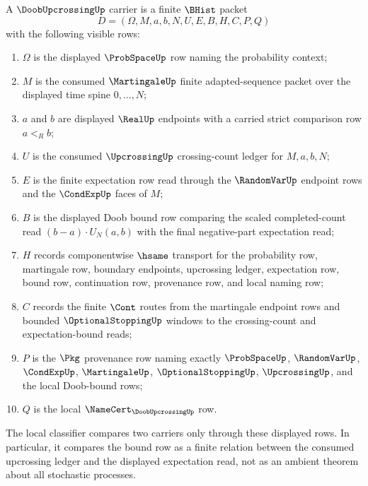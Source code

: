 \begin{definition}
\label{def:doob-upcrossing-carrier}
A $\DoobUpcrossingUp$ carrier is a finite $\BHist$ packet
$$
D=(\Omega,M,a,b,N,U,E,B,H,C,P,Q)
$$
with the following visible rows:
\begin{enumerate}
\item $\Omega$ is the displayed $\ProbSpaceUp$ row naming the probability context;
\item $M$ is the consumed $\MartingaleUp$ finite adapted-sequence packet over the displayed time spine $0,\ldots,N$;
\item $a$ and $b$ are displayed $\RealUp$ endpoints with a carried strict comparison row $a<_R b$;
\item $U$ is the consumed $\UpcrossingUp$ crossing-count ledger for $M,a,b,N$;
\item $E$ is the finite expectation row read through the $\RandomVarUp$ endpoint rows and the $\CondExpUp$ faces of $M$;
\item $B$ is the displayed Doob bound row comparing the scaled completed-count read $(b-a)\cdot U_N(a,b)$ with the final negative-part expectation read;
\item $H$ records componentwise $\hsame$ transport for the probability row, martingale row, boundary endpoints, upcrossing ledger, expectation row, bound row, continuation row, provenance row, and local naming row;
\item $C$ records the finite $\Cont$ routes from the martingale endpoint rows and bounded $\OptionalStoppingUp$ windows to the crossing-count and expectation-bound reads;
\item $P$ is the $\Pkg$ provenance row naming exactly $\ProbSpaceUp$, $\RandomVarUp$, $\CondExpUp$, $\MartingaleUp$, $\OptionalStoppingUp$, $\UpcrossingUp$, and the local Doob-bound rows;
\item $Q$ is the local $\NameCert_{\DoobUpcrossingUp}$ row.
\end{enumerate}
The local classifier compares two carriers only through these displayed rows. In particular, it compares the bound row as a finite relation between the consumed upcrossing ledger and the displayed expectation read, not as an ambient theorem about all stochastic processes.
\end{definition}

